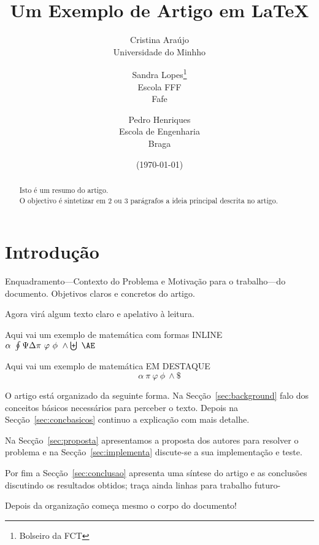 \documentclass{article}%
\title{Um Exemplo de Artigo em \LaTeX} %
\author{Cristina Araújo %
        \\ Universidade do Minhho %
        \and            %
        Sandra Lopes\thanks{Bolseiro da FCT} %
        \\Escola FFF\\ Fafe
        \and
        Pedro Henriques\\Escola de Engenharia\\ Braga
 } %
\date{ (\today)} %
\begin{document}

\maketitle %

\begin{abstract} %
\noindent Isto é um resumo do artigo. \\ %
O objectivo é sintetizar em 2 ou 3 parágrafos a ideia principal descrita no artigo.
\end{abstract}


\section{Introdução} \label{sec:introducao} %
Enquadramento---Contexto do Problema e Motivação para o trabalho---do documento.
Objetivos claros e concretos do artigo.

Agora virá algum texto claro e apelativo à leitura.

Aqui vai um exemplo de matemática com formas INLINE
 $ \alpha\   \oint   \Psi \Delta \pi \  \varphi\ \phi\ \wedge \biguplus\ {\AE}  $

Aqui vai um exemplo de matemática  EM DESTAQUE
\[  \alpha\   \pi \  \varphi\ \phi\ \wedge \$   \]

O artigo está organizado da seguinte forma.
Na Secção~\ref{sec:background} %
falo dos conceitos básicos necessários para perceber o texto.
Depois na Secção~\ref{sec:concbasicos} continuo a explicação com mais detalhe.

Na Secção~\ref{sec:proposta} apresentamos a proposta dos autores para resolver o problema
e na Secção~\ref{sec:implementa} discute-se a sua implementação e teste.

Por fim a Secção~\ref{sec:conclusao} apresenta uma síntese do artigo e as conclusões discutindo os resultados obtidos;
traça ainda linhas para trabalho futuro-

Depois da organização começa mesmo o corpo do documento!
\end{document}
